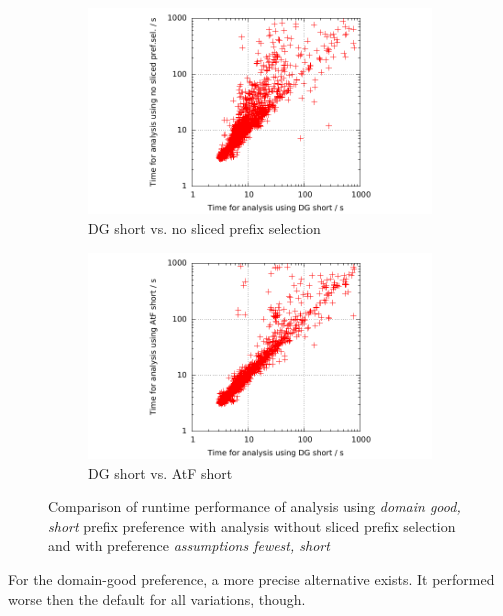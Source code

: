 \begin{figure}
\begin{subfigure}{.48\linewidth}
\includegraphics[trim=2cm 0 1cm 0, clip=true, scale=0.9]{evaluation/sp_cputime_DGS_noSelection}
\caption{DG short vs. no sliced prefix selection}
\end{subfigure}%
\hfill
\begin{subfigure}{.48\linewidth}
\includegraphics[trim=2cm 0 1cm 0, clip=true, scale=0.9]{evaluation/sp_cputime_DGS_AtFS}
\caption{DG short vs. AtF short}
\end{subfigure}
\caption{Comparison of runtime performance of analysis using \emph{domain good, short} prefix preference with analysis without sliced prefix selection and with preference \emph{assumptions fewest, short}}
\label{fig:leqComp:stopAmount}
\end{figure}

For the domain-good preference, a more precise alternative exists. It performed worse then the default for all variations, though.

